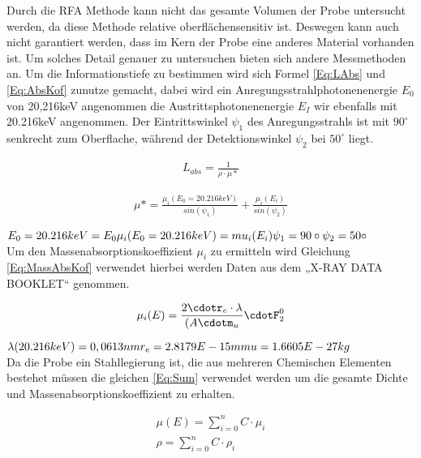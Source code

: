 Durch die RFA Methode kann nicht das gesamte Volumen der Probe untersucht werden, da diese Methode relative oberflächensensitiv ist. Deswegen kann auch nicht garantiert werden, dass im Kern der Probe eine anderes Material vorhanden ist. Um solches Detail genauer zu untersuchen bieten sich andere Messmethoden an.
Um die Informationstiefe zu bestimmen wird sich Formel \ref{Eq:LAbs} und \ref{Eq:AbsKof} zunutze gemacht, dabei wird ein Anregungsstrahlphotonenenergie $E_0$ von 20,216keV angenommen die Austrittsphotonenenergie $E_I$ wir ebenfalls mit 20.216keV angenommen. Der Eintrittswinkel $\psi_1$ des Anregungsstrahls ist mit $90^\circ$  senkrecht zum Oberflache, während der Detektionswinkel $\psi_2$ bei $50^\circ$  liegt.

\begin{align}
\label{Eq:LAbs}
  L_{abs}=\displaystyle\frac{1}{\rho\cdot\mu*}
\end{align}

\begin{align}
\label{Eq:AbsKof}
  \mu* = \displaystyle\frac{\mu_i(E_0 = 20.216 keV)}{sin(\psi_1)} + \displaystyle\frac{\mu_i(E_i)}{sin(\psi_2)}
\end{align}

$E_0 =20.216 keV = E_0\\
\mu_i(E_0 = 20.216 keV) = mu_i(E_i)\\
\psi_1 = 90\circ\\
\psi_2 = 50\circ$\\

Um den Massenabsorptionskoeffizient $\mu_i$ zu ermitteln wird Gleichung \ref{Eq:MassAbsKof} verwendet hierbei werden Daten aus dem „X-RAY DATA BOOKLET“ genommen. 

\begin{align}
\label{Eq:MassAbsKof}
  \mu_i(E) = \displaystyle\frac{2\cdotr_e\cdot\lambda}{(A\cdotm_u}\cdotF^0_2
\end{align}

$\lambda (20.216 keV)= 0,0613 nm\\
r_e = 2.8179E-15 m\\
mu = 1.6605E-27 kg$\\

Da die Probe ein Stahllegierung ist, die aus mehreren Chemischen Elementen bestehet müssen die gleichen \ref{Eq:Sum} verwendet werden um die gesamte Dichte und Massenabsorptionskoeffizient zu erhalten.

\begin{align}
\label{Eq:Sum}
  \mu(E) = \sum\limits_{i=0}^{n} C\cdot\mu_i\\
  \rho = \sum\limits_{i=0}^{n} C\cdot\rho_i
\end{align}

